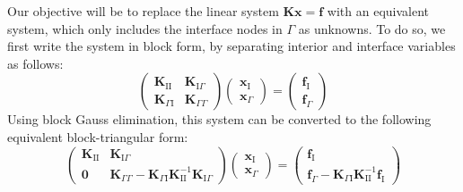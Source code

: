 Our objective will be to replace the linear system $\mathbf{Kx=f}$
with an equivalent system, which only includes the interface nodes in
$\Gamma$ as unknowns. To do so, we first write the system in block
form, by separating interior and interface variables as follows:
$$
\left(
\begin{array}{cc}
\mathbf{K}_{\mathrm{I}\mathrm{I}} & \mathbf{K}_{\mathrm{I}\Gamma} \\
\mathbf{K}_{\Gamma \mathrm{I}} & \mathbf{K}_{\Gamma\Gamma}
\end{array}
\right)
\left(
\begin{array}{c}
\mathbf{x}_{\mathrm{I}} \\
\mathbf{x}_{\Gamma}
\end{array}
\right)
=
\left(
\begin{array}{c}
\mathbf{f}_{\mathrm{I}} \\
\mathbf{f}_{\Gamma}
\end{array}
\right)
$$
Using block Gauss elimination, this system can be converted to the
following equivalent block-triangular form:
\begin{equation}
\left(
\begin{array}{cc}
\!\!\mathbf{K}_{\mathrm{I}\mathrm{I}}\!\!\! & \!\!\!\mathbf{K}_{\mathrm{I}\Gamma}\!\! \\
\!\!\mathbf{0}\!\!\! & \!\!\!\mathbf{K}_{\Gamma\Gamma}- \mathbf{K}_{\Gamma\mathrm{I}}\mathbf{K}_{\mathrm{I}\mathrm{I}}^{-1}\mathbf{K}_{\mathrm{I}\Gamma}\!\!
\end{array}
\right)
\left(
\begin{array}{c}
\!\!\mathbf{x}_{\mathrm{I}}\!\! \\
\!\!\mathbf{x}_{\Gamma}\!\!
\end{array}
\right)
=
\left(
\begin{array}{c}
\!\!\mathbf{f}_{\mathrm{I}}\!\! \\
\!\!\mathbf{f}_{\Gamma}-\mathbf{K}_{\Gamma\mathrm{I}}\mathbf{K}_{\mathrm{I}\mathrm{I}}^{-1}\mathbf{f}_{\mathrm{I}}\!\!
\end{array}
\right)
\label{eqn:macroblocks:schur}
\end{equation}


